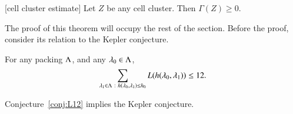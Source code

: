 \begin{theorem}[cell cluster estimate]\label{lemma:superineq} 
Let $Z$ be any cell cluster.  Then $\Gamma(Z)\ge 0$.
\end{theorem}

The proof of this theorem will occupy the rest of the section.  Before the proof, consider its relation to the Kepler conjecture.


\begin{conjecture}\label{conj:L12} For any packing $\Lambda$, and
any $\lambda_0\in\Lambda$, 
\begin{equation}\label{eqn:L12}
\sum_{\lambda_1\in\Lambda\ :\  h(\lambda_0,\lambda_1)\le {h_0}} L(h(\lambda_0,\lambda_1)) \le 12.
\end{equation}
\end{conjecture}

\begin{theorem}\label{theorem:mk2}
Conjecture~\ref{conj:L12} implies the Kepler conjecture.
\end{theorem}

